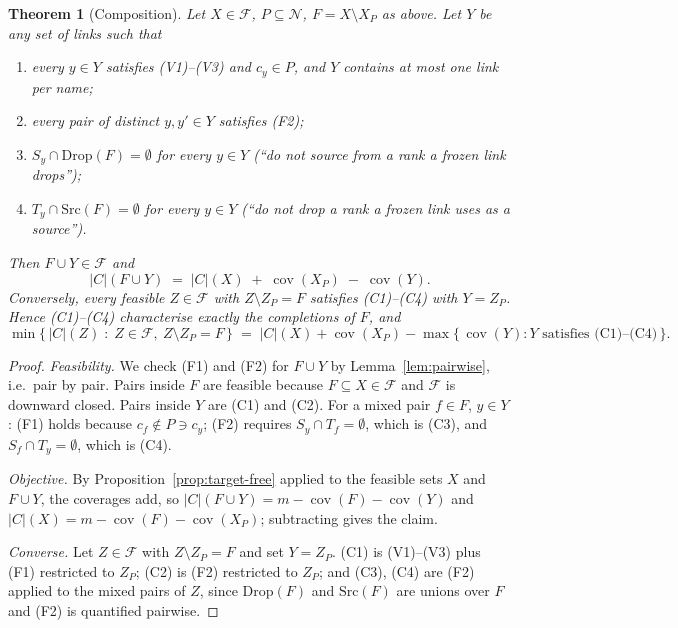 \documentclass[11pt,a4paper]{article}
\theoremstyle{definition}
\theoremstyle{plain}
\newtheorem{theorem}{Theorem}
\theoremstyle{remark}
\newcommand{\cov}{\operatorname{cov}}
\newcommand{\Feas}{\mathcal{F}}
\newcommand{\Names}{\mathcal{N}}
\begin{document}
\begin{theorem}[Composition]
\label{thm:compose}
Let $X \in \Feas$, $P \subseteq \Names$, $F = X \setminus X_P$ as above.
Let $Y$ be any set of links such that
\begin{enumerate}
\item[(C1)] every $y \in Y$ satisfies (V1)--(V3) and $c_y \in P$, and
  $Y$ contains at most one link per name;
\item[(C2)] every pair of distinct $y, y' \in Y$ satisfies (F2);
\item[(C3)] $S_y \cap \mathrm{Drop}(F) = \emptyset$ for every $y \in Y$
  \quad (``do not source from a rank a frozen link drops'');
\item[(C4)] $T_y \cap \mathrm{Src}(F) = \emptyset$ for every $y \in Y$
  \quad (``do not drop a rank a frozen link uses as a source'').
\end{enumerate}
Then $F \cup Y \in \Feas$ and
\[
  |C|(F \cup Y) \;=\; |C|(X) \;+\; \cov(X_P) \;-\; \cov(Y).
\]
Conversely, every feasible $Z \in \Feas$ with $Z \setminus Z_P = F$
satisfies (C1)--(C4) with $Y = Z_P$. Hence (C1)--(C4) characterise
exactly the completions of $F$, and
\[
  \min\bigl\{\, |C|(Z) \;:\; Z \in \Feas,\ Z \setminus Z_P = F \,\bigr\}
  \;=\;
  |C|(X) + \cov(X_P) - \max\bigl\{\, \cov(Y) : Y \text{ satisfies (C1)--(C4)} \,\bigr\}.
\]
\end{theorem}

\begin{proof}
\emph{Feasibility.} We check (F1) and (F2) for $F \cup Y$ by
Lemma~\ref{lem:pairwise}, i.e.\ pair by pair. Pairs inside $F$ are
feasible because $F \subseteq X \in \Feas$ and $\Feas$ is downward
closed. Pairs inside $Y$ are (C1) and (C2). For a mixed pair
$f \in F$, $y \in Y$: (F1) holds because $c_f \notin P \ni c_y$; (F2)
requires $S_y \cap T_f = \emptyset$, which is (C3), and
$S_f \cap T_y = \emptyset$, which is (C4).

\emph{Objective.} By Proposition~\ref{prop:target-free} applied to the
feasible sets $X$ and $F \cup Y$, the coverages add, so
$|C|(F\cup Y) = m - \cov(F) - \cov(Y)$ and
$|C|(X) = m - \cov(F) - \cov(X_P)$; subtracting gives the claim.

\emph{Converse.} Let $Z \in \Feas$ with $Z \setminus Z_P = F$ and set
$Y = Z_P$. (C1) is (V1)--(V3) plus (F1) restricted to $Z_P$; (C2) is
(F2) restricted to $Z_P$; and (C3), (C4) are (F2) applied to the mixed
pairs of $Z$, since $\mathrm{Drop}(F)$ and $\mathrm{Src}(F)$ are unions
over $F$ and (F2) is quantified pairwise.
\end{proof}
\end{document}
